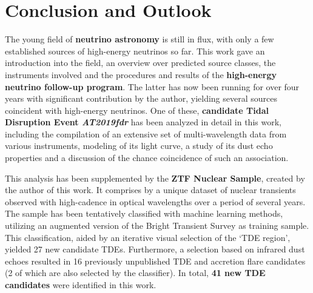 \chapter*{Conclusion and Outlook}\label{conclusion}
The young field of \textbf{neutrino astronomy} is still in flux, with only a few established sources of high-energy neutrinos so far. This work gave an introduction into the field, an overview over predicted source classes, the instruments involved and the procedures and results of the \textbf{high-energy neutrino follow-up program}. The latter has now been running for over four years with significant contribution by the author, yielding several sources coincident with high-energy neutrinos. One of these, \textbf{candidate Tidal Disruption Event \textit{AT2019fdr}} has been analyzed in detail in this work, including the compilation of an extensive set of multi-wavelength data from various instruments, modeling of its light curve, a study of its dust echo properties and a discussion of the chance coincidence of such an association.

This analysis has been supplemented by the \textbf{ZTF Nuclear Sample}, created by the author of this work. It comprises by a unique dataset of nuclear transients observed with high-cadence in optical wavelengths over a period of several years. The sample has been tentatively classified with machine learning methods, utilizing an augmented version of the Bright Transient Survey as training sample. This classification, aided by an iterative visual selection of the `TDE region', yielded 27 new candidate TDEs. Furthermore, a selection based on infrared dust echoes resulted in 16 previously unpublished TDE and accretion flare candidates (2 of which are also selected by the classifier). In total, \textbf{41 new TDE candidates} were identified in this work.


